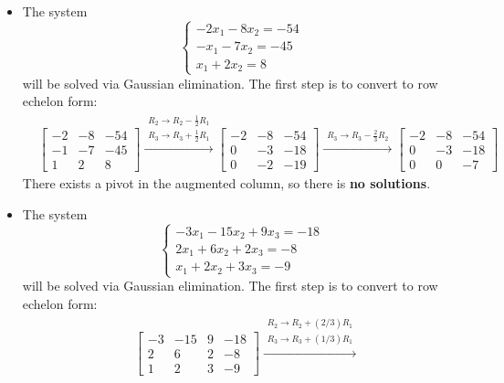 \documentclass{article}
\begin{document}
\begin{itemize}
\item 
The system
\[\left\{\begin{array}{c}
-2x_1 - 8x_2 = -54 \\
-x_1 - 7x_2 = -45 \\
x_1 + 2x_2 = 8
\end{array}\right.\]
will be solved via Gaussian elimination. The first step is to convert to row echelon form: 
\begin{align*} 
& \left[\begin{array}{cc|c}
-2 & -8 & -54 \\
-1 & -7 & -45 \\
1 & 2 & 8 
\end{array}\right]
\xrightarrow{\begin{array}{c} R_2 \rightarrow R_2 - \frac{1}{2}R_1 \\ R_3 \rightarrow R_3 + \frac{1}{2}R_1 \end{array}}
\left[\begin{array}{cc|c}
-2 & -8 & -54 \\
0 & -3 & -18 \\
0 & -2 & -19 
\end{array}\right]
\xrightarrow{\begin{array}{c} R_3 \rightarrow R_3 - \frac{2}{3}R_2 \end{array}}
\left[\begin{array}{cc|c}
-2 & -8 & -54 \\
0 & -3 & -18 \\
0 & 0 & -7
\end{array}\right]
\end{align*}
There exists a pivot in the augmented column, so there is {\bf no solutions}. 
\item 
The system
\[\left\{\begin{array}{c}
-3x_1 - 15x_2 + 9x_3 = -18 \\
2x_1 + 6x_2 + 2x_3 = -8 \\
x_1 + 2x_2 + 3x_3 = -9
\end{array}\right.\]
will be solved via Gaussian elimination. The first step is to convert to row echelon form:  
\begin{align*}
& \left[\begin{array}{ccc|c}
-3 & -15 & 9 & -18\\
2 & 6 & 2 & -8 \\
1 & 2 & 3 & -9 
\end{array}\right]
\xrightarrow{\begin{array}{c} R_2 \rightarrow R_2 + (2/3)R_1 \\ R_3 \rightarrow R_3 + (1/3)R_1 \end{array}}

\end{align*}
\end{itemize}
\end{document}
